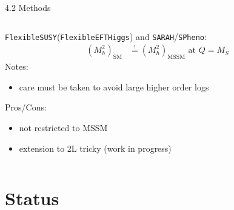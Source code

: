 \documentclass[hyperref={pdfpagelabels=false},ngerman]{beamer}
\newcommand{\cmark}{\ding{51}}%
\newcommand{\xmark}{\ding{55}}%
\newcommand{\ok}{\textcolor{darkgreen}{\cmark}}
\newcommand{\notok}{\textcolor{red}{\xmark}}
\newcommand{\MS}{\ensuremath{M_S}}
\newcommand{\SM}{\ensuremath{\text{SM}}}
\newcommand{\MSSM}{\ensuremath{\text{MSSM}}}
\newcommand{\fs}{\texttt{FlexibleSUSY}\xspace}
\newcommand{\feft}{\texttt{FlexibleEFTHiggs}\xspace}
\newcommand{\SPheno}{\texttt{SPheno}\xspace}
\newcommand{\SARAH}{\texttt{SARAH}\xspace}
\begin{document}
\begin{frame}{4.2 Methods}
    \begin{columns}
    \begin{column}{0.5\textwidth}
      \centering
      \texttt{[image: \{\{plots/kuts-9/4.2.2]}}}
    \end{column}
    \begin{column}{0.5\textwidth}
      \fs (\feft) and \SARAH/\SPheno:
      \begin{align*}
        (M_h^2)_{\SM} &\overset{!}{=} (M_h^2)_{\MSSM} \text{ at } Q = \MS
      \end{align*}
      Notes:
      \begin{itemize}
      \item care must be taken to avoid large higher order logs
      \end{itemize}
      Pros/Cons:
      \begin{itemize}
      \item[\ok] not restricted to MSSM
      \item[\notok] extension to 2L tricky (work in progress)
      \end{itemize}
    \end{column}
  \end{columns}
\end{frame}

\section{Status}
\end{document}
